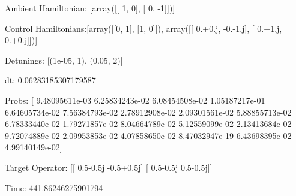 \documentclass{article}
\begin{document}
    

\newpage

Ambient Hamiltonian: [array([[ 1,  0],
       [ 0, -1]])]

Control Hamiltonians:[array([[0, 1],
       [1, 0]]), array([[ 0.+0.j, -0.-1.j],
       [ 0.+1.j,  0.+0.j]])]

Detunings: [(1e-05, 1), (0.05, 2)]

 dt: 0.06283185307179587

Probs: [  9.48095611e-03   6.25834243e-02   6.08454508e-02   1.05187217e-01
   6.64605734e-02   7.56384793e-02   2.78912908e-02   2.09301561e-02
   5.88855713e-02   6.78333440e-02   1.79271857e-02   8.04664789e-02
   5.12559099e-02   2.13413684e-02   9.72074889e-02   2.09953853e-02
   4.07858650e-02   8.47032947e-19   6.43698395e-02   4.99140149e-02]

Target Operator: [[ 0.5-0.5j -0.5+0.5j]
 [ 0.5-0.5j  0.5-0.5j]]

Time: 441.86246275901794
\end{document}
